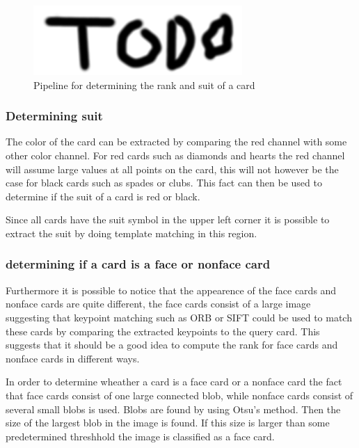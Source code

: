 \documentclass[journal,twoside]{IEEEtran}
\begin{document}
\begin{figure}[placement h]
\centering
\includegraphics[scale=0.4, trim= 0cm 0cm 0cm 0cm]{TODO.png}
\caption{Pipeline for determining the rank and suit of a card}
\label{fig:RankSuitOutline}
\end{figure}

\subsubsection{Determining suit}

The color of the card can be extracted by comparing the red channel with some other color channel. For red cards such as diamonds and hearts the red channel will assume large values at all points on the card, this will not however be the case for black cards such as spades or clubs. This fact can then be used to determine if the suit of a card is red or black.

Since all cards have the suit symbol in the upper left corner it is possible to extract the suit by doing template matching in this region.

\subsubsection{determining if a card is a face or nonface card}

Furthermore it is possible to notice that the appearence of the face cards and nonface cards are quite different, the face cards consist of a large image suggesting that keypoint matching such as ORB or SIFT could be used to match these cards by comparing the extracted keypoints to the query card. This suggests that it should be a good idea to compute the rank for face cards and nonface cards in different ways.

In order to determine wheather a card is a face card or a nonface card the fact that face cards consist of one large connected blob, while nonface cards consist of several small blobs is used. Blobs are found by using Otsu's method. Then the size of the largest blob in the image is found. If this size is larger than some predetermined threshhold the image is classified as a face card.
\end{document}
